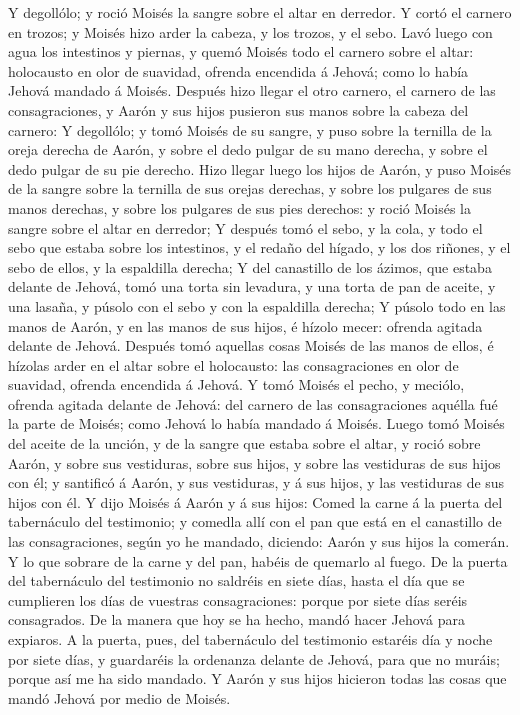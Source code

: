 Y degollólo; y roció Moisés la sangre sobre el altar en derredor.
 Y cortó el carnero en trozos; y Moisés hizo arder la
cabeza, y los trozos, y el sebo.  Lavó luego con agua los
intestinos y piernas, y quemó Moisés todo el carnero sobre el altar:
holocausto en olor de suavidad, ofrenda encendida á Jehová; como lo
había Jehová mandado á Moisés.  Después hizo llegar el otro
carnero, el carnero de las consagraciones, y Aarón y sus hijos pusieron
sus manos sobre la cabeza del carnero:  Y degollólo; y tomó
Moisés de su sangre, y puso sobre la ternilla de la oreja derecha de
Aarón, y sobre el dedo pulgar de su mano derecha, y sobre el dedo pulgar
de su pie derecho.  Hizo llegar luego los hijos de Aarón, y
puso Moisés de la sangre sobre la ternilla de sus orejas derechas, y
sobre los pulgares de sus manos derechas, y sobre los pulgares de sus
pies derechos: y roció Moisés la sangre sobre el altar en derredor;
 Y después tomó el sebo, y la cola, y todo el sebo que
estaba sobre los intestinos, y el redaño del hígado, y los dos riñones,
y el sebo de ellos, y la espaldilla derecha;  Y del
canastillo de los ázimos, que estaba delante de Jehová, tomó una torta
sin levadura, y una torta de pan de aceite, y una lasaña, y púsolo con
el sebo y con la espaldilla derecha;  Y púsolo todo en las
manos de Aarón, y en las manos de sus hijos, é hízolo mecer: ofrenda
agitada delante de Jehová.  Después tomó aquellas cosas
Moisés de las manos de ellos, é hízolas arder en el altar sobre el
holocausto: las consagraciones en olor de suavidad, ofrenda encendida á
Jehová.  Y tomó Moisés el pecho, y meciólo, ofrenda agitada
delante de Jehová: del carnero de las consagraciones aquélla fué la
parte de Moisés; como Jehová lo había mandado á Moisés. 
Luego tomó Moisés del aceite de la unción, y de la sangre que estaba
sobre el altar, y roció sobre Aarón, y sobre sus vestiduras, sobre sus
hijos, y sobre las vestiduras de sus hijos con él; y santificó á Aarón,
y sus vestiduras, y á sus hijos, y las vestiduras de sus hijos con él.
 Y dijo Moisés á Aarón y á sus hijos: Comed la carne á la
puerta del tabernáculo del testimonio; y comedla allí con el pan que
está en el canastillo de las consagraciones, según yo he mandado,
diciendo: Aarón y sus hijos la comerán.  Y lo que sobrare
de la carne y del pan, habéis de quemarlo al fuego.  De la
puerta del tabernáculo del testimonio no saldréis en siete días, hasta
el día que se cumplieren los días de vuestras consagraciones: porque por
siete días seréis consagrados.  De la manera que hoy se ha
hecho, mandó hacer Jehová para expiaros.  A la puerta,
pues, del tabernáculo del testimonio estaréis día y noche por siete
días, y guardaréis la ordenanza delante de Jehová, para que no muráis;
porque así me ha sido mandado.  Y Aarón y sus hijos
hicieron todas las cosas que mandó Jehová por medio de Moisés.


